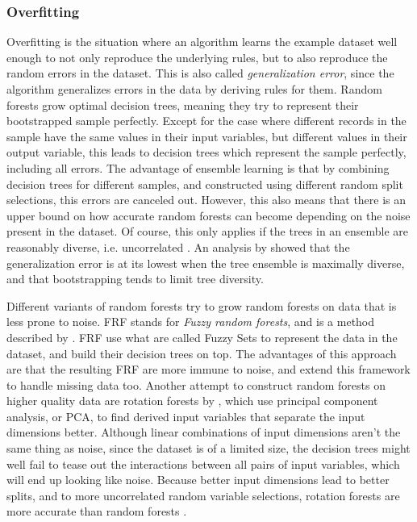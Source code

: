 \documentclass[a4paper,man,12pt,apacite]{apa6} %
\begin{document}
\subsubsection{Overfitting}
Overfitting \cite{wpOF} is the situation where an algorithm learns the
example dataset well enough to not only reproduce the underlying rules,
but to also reproduce the random errors in the dataset.
This is also called \emph{generalization error}, since the algorithm
generalizes errors in the data by deriving rules for them.
Random forests grow optimal decision trees, meaning they try to represent
their bootstrapped sample perfectly.
Except for the case where different records in the sample have the same
values in their input variables, but different values in their output variable,
this leads to decision trees which represent the sample perfectly,
including all errors.
The advantage of ensemble learning is that by combining decision trees
for different samples, and constructed using different random split selections,
this errors are canceled out.
However, this also means that there is an upper bound on how accurate
random forests can become depending on the noise present in the dataset.
Of course, this only applies if the trees in an ensemble are reasonably
diverse, i.e. uncorrelated \cite{breiman2001random}.
An analysis by \cite{liu2005maximizing} showed that the generalization error
is at its lowest when the tree ensemble is maximally diverse,
and that bootstrapping tends to limit tree diversity.

Different variants of random forests try to grow random forests on data
that is less prone to noise.
FRF stands for \emph{Fuzzy random forests}, and is a method described by
\cite{bonissone2008fuzzy}.
FRF use what are called Fuzzy Sets to represent the data in the dataset,
and build their decision trees on top.
The advantages of this approach are that the resulting FRF are more immune
to noise, and \cite{cadenas2012extending} extend this framework to
handle missing data too.
Another attempt to construct random forests on higher quality data are
rotation forests by \cite{rodriguez2006rotation}, which use
principal component analysis, or PCA, to find derived input variables that
separate the input dimensions better.
Although linear combinations of input dimensions aren't the same thing
as noise, since the dataset is of a limited size, the decision trees
might well fail to tease out the interactions between all pairs of input
variables, which will end up looking like noise.
Because better input dimensions lead to better splits, and to more
uncorrelated random variable selections, rotation forests are more accurate
than random forests \cite{rodriguez2006rotation}.
\end{document}
